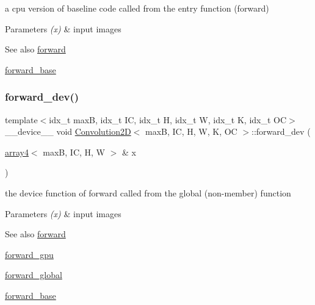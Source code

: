 a cpu version of baseline code called from the entry function (forward) 


\begin{DoxyParams}{Parameters}
{\em (x)} & input images \\
\hline
\end{DoxyParams}
\begin{DoxySeeAlso}{See also}
\hyperlink{structConvolution2D_ae6dcfaea38b779de24bbda730c57083e}{forward} 

\hyperlink{structConvolution2D_aa969d35c6c2ca209354d3fd9249fcf82}{forward\+\_\+base} 
\end{DoxySeeAlso}
\mbox{\label{structConvolution2D_a1e5d3b49b05f8444178be5f73f59bedd}} 
\subsubsection{\texorpdfstring{forward\+\_\+dev()}{forward\_dev()}}
{\footnotesize\ttfamily template$<$idx\+\_\+t maxB, idx\+\_\+t IC, idx\+\_\+t H, idx\+\_\+t W, idx\+\_\+t K, idx\+\_\+t OC$>$ \\
\+\_\+\+\_\+device\+\_\+\+\_\+ void \hyperlink{structConvolution2D}{Convolution2D}$<$ maxB, IC, H, W, K, OC $>$\+::forward\+\_\+dev (\begin{DoxyParamCaption}\item[{\hyperlink{structarray4}{array4}$<$ maxB, IC, H, W $>$ \&}]{x }\end{DoxyParamCaption})\hspace{0.3cm}{\ttfamily [inline]}}



the device function of forward called from the global (non-\/member) function 


\begin{DoxyParams}{Parameters}
{\em (x)} & input images \\
\hline
\end{DoxyParams}
\begin{DoxySeeAlso}{See also}
\hyperlink{structConvolution2D_ae6dcfaea38b779de24bbda730c57083e}{forward} 

\hyperlink{structConvolution2D_ac8bbdceed275bddaaf937e1b7ce2e5ac}{forward\+\_\+gpu} 

\hyperlink{softmaxcrossentropy_8h_a578aeeb166bd06e800d9b396eab48b35}{forward\+\_\+global} 

\hyperlink{structConvolution2D_aa969d35c6c2ca209354d3fd9249fcf82}{forward\+\_\+base} 
\end{DoxySeeAlso}
\mbox{\label{structConvolution2D_ac8bbdceed275bddaaf937e1b7ce2e5ac}} 

